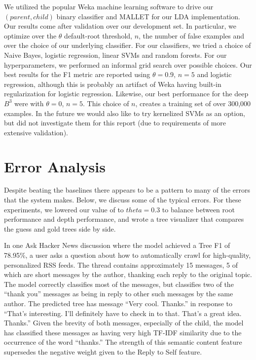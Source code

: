 \documentclass{article}
\begin{document}
We utilized the popular Weka \cite{Weka2009} machine learning software to drive our
$(parent,child)$ binary classifier and MALLET \cite{McCallum2002Mallet} for our LDA 
implementation. Our results come after  validation over our development set. 
In particular, we optimize over the $\theta$ 
default-root threshold, $n$, the number of
false examples and over the choice of our underlying classifier. For our
classifiers, we tried a choice of Naive Bayes, logistic regression, 
linear SVMs and random forests. For our hyperparameters, we performed an
informal grid search over possible choices. Our best results for the F1 metric
are reported using $\theta=0.9$, $n=5$ and logistic regression, although this
is probably an artifact of Weka having built-in regularization for logistic
regression. Likewise, our best performance for the deep $B^3$ were with
$\theta=0$, $n=5$. This choice of $n$, creates a training set of over 300,000
examples. In the future we would also like to try kernelized SVMs as an
option, but did not investigate them for this report (due to requirements of
more extensive validation).

\section{Error Analysis}
Despite beating the baselines there appears to be a pattern to many of the
errors that the system makes. Below, we discuss some of the typical errors.
For these experiments, we lowered our value of to $theta=0.3$ to balance 
between root performance and depth performance, and wrote a tree visualizer
that compares the guess and gold trees side by side.

In one Ask Hacker News discussion where the model achieved a Tree F1 of 78.95\%,
a user asks a question about how to automatically crawl for high-quality, 
personalized RSS feeds. The thread contains approximately 15 messages, 5 of 
which are short messages by the author, thanking each reply to the original 
topic. The model correctly classifies most of the messages, but classifies two 
of the ``thank you'' messages as being in reply to other such messages by the 
same author. The predicted tree has message ``Very cool. Thanks.'' in response 
to ``That's interesting. I'll definitely have to check in to that. That's a 
great idea. Thanks.'' Given the brevity of both messages, especially of the 
child, the model has classified these messages as having very high TF-IDF 
similarity due to the occurrence of the word ``thanks.'' The strength of this 
semantic content feature supersedes the negative weight given to the Reply to 
Self feature.
\end{document}
